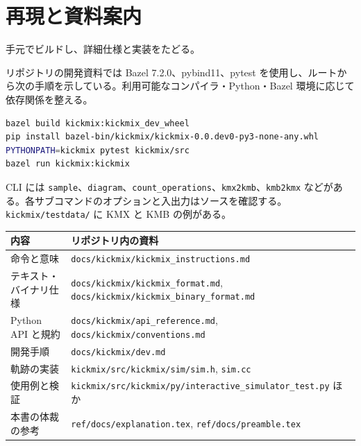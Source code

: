 \documentclass[a4paper,11pt,oneside,openany]{ltjsbook}
\newcommand{\code}[1]{\nolinkurl{#1}}
\begin{document}
\chapter{再現と資料案内}
\begin{goal}手元でビルドし、詳細仕様と実装をたどる。\end{goal}
リポジトリの開発資料では Bazel 7.2.0、pybind11、pytest を使用し、ルートから次の手順を示している。利用可能なコンパイラ・Python・Bazel 環境に応じて依存関係を整える。
\begin{lstlisting}[language=bash]
bazel build kickmix:kickmix_dev_wheel
pip install bazel-bin/kickmix/kickmix-0.0.dev0-py3-none-any.whl
PYTHONPATH=kickmix pytest kickmix/src
bazel run kickmix:kickmix
\end{lstlisting}
CLI には \code{sample}、\code{diagram}、\code{count_operations}、\code{kmx2kmb}、\code{kmb2kmx} などがある。各サブコマンドのオプションと入出力はソースを確認する。\code{kickmix/testdata/} に KMX と KMB の例がある。
\begin{center}\begin{tabularx}{\textwidth}{lX}\toprule 内容 & リポジトリ内の資料\\\midrule
命令と意味 & \code{docs/kickmix/kickmix_instructions.md}\\
テキスト・バイナリ仕様 & \code{docs/kickmix/kickmix_format.md}, \code{docs/kickmix/kickmix_binary_format.md}\\
Python API と規約 & \code{docs/kickmix/api_reference.md}, \code{docs/kickmix/conventions.md}\\
開発手順 & \code{docs/kickmix/dev.md}\\
軌跡の実装 & \code{kickmix/src/kickmix/sim/sim.h}, \code{sim.cc}\\
使用例と検証 & \code{kickmix/src/kickmix/py/interactive_simulator_test.py} ほか\\
本書の体裁の参考 & \code{ref/docs/explanation.tex}, \code{ref/docs/preamble.tex}\\\bottomrule\end{tabularx}\end{center}
\end{document}
